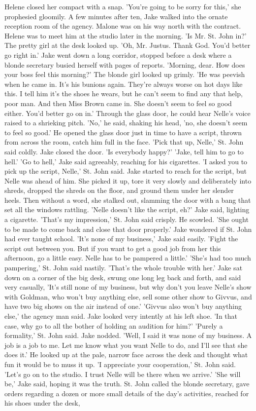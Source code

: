 \documentclass{novel}
\begin{document}
Helene closed her compact with a snap. 'You’re going to be sorry for this,' she prophesied gloomily. A few minutes after ten, Jake walked into the ornate reception room of the agency. Malone was on his way north with the contract. Helene was to meet him at the studio later in the morning. 'Is Mr. St. John in?' The pretty girl at the desk looked up. 'Oh, Mr. Justus. Thank God. You’d better go right in.' Jake went down a long corridor, stopped before a desk where a blonde secretary busied herself with pages of reports. 'Morning, dear. How does your boss feel this morning?' The blonde girl looked up grimly. 'He was peevish when he came in. It’s his bunions again. They’re always worse on hot days like this. I tell him it’s the shoes he wears, but he can’t seem to find any that help, poor man. And then Miss Brown came in. She doesn’t seem to feel so good either. You’d better go on in.' Through the glass door, he could hear Nelle’s voice raised to a shrieking pitch. 'No,' he said, shaking his head, 'no, she doesn’t seem to feel so good.' He opened the glass door just in time to have a script, thrown from across the room, catch him full in the face. 'Pick that up, Nelle,' St. John said coldly. Jake closed the door. 'Is everybody happy?' 'Jake, tell him to go to hell.' 'Go to hell,' Jake said agreeably, reaching for his cigarettes. 'I asked you to pick up the script, Nelle,' St. John said. Jake started to reach for the script, but Nelle was ahead of him. She picked it up, tore it very slowly and deliberately into shreds, dropped the shreds on the floor, and ground them under her slender heels. Then without a word, she stalked out, slamming the door with a bang that set all the windows rattling. 'Nelle doesn’t like the script, eh?' Jake said, lighting a cigarette. 'That’s my impression,' St. John said crisply. He scowled. 'She ought to be made to come back and close that door properly.' Jake wondered if St. John had ever taught school. 'It’s none of my business,' Jake said easily. 'Fight the script out between you. But if you want to get a good job from her this afternoon, go a little easy. Nelle has to be pampered a little.' 'She’s had too much pampering,' St. John said nastily. 'That’s the whole trouble with her.' Jake sat down on a corner of the big desk, swung one long leg back and forth, and said very casually, 'It’s still none of my business, but why don’t you leave Nelle’s show with Goldman, who won’t buy anything else, sell some other show to Givvus, and have two big shows on the air instead of one.' 'Givvus also won’t buy anything else,' the agency man said. Jake looked very intently at his left shoe. 'In that case, why go to all the bother of holding an audition for him?' 'Purely a formality,' St. John said. Jake nodded. 'Well, I said it was none of my business. A job is a job to me. Let me know what you want Nelle to do, and I'll see that she does it.' He looked up at the pale, narrow face across the desk and thought what fun it would be to muss it up. 'I appreciate your cooperation,' St. John said. 'Let’s go on to the studio. I trust Nelle will be there when we arrive.' 'She will be,' Jake said, hoping it was the truth. St. John called the blonde secretary, gave orders regarding a dozen or more small details of the day’s activities, reached for his shoes under the desk, 
\end{document}
